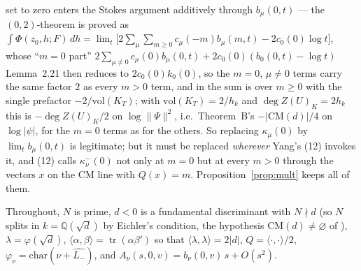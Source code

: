 \documentclass[11pt,reqno]{amsart}
\theoremstyle{plain}
\theoremstyle{definition}
\DeclareMathOperator{\tr}{tr}
\newcommand{\Q}{\mathbb{Q}}
\newcommand{\Lm}{L_{-}}
\begin{document}
set to zero enters the Stokes argument \cite[(33)]{Schofer} additively through $b_\mu(0,t)$ --- the
$(0,2)$-theorem is proved as $\int\Phi(z_0,h;F)\,dh=\lim_t\bigl[2\sum_\mu\sum_{m\ge0}c_\mu(-m)b_\mu(m,t)
-2c_0(0)\log t\bigr]$, whose ``$m=0$ part'' $2\sum_{\mu\neq0}c_\mu(0)b_\mu(0,t)+2c_0(0)(b_0(0,t)-\log t)$
Lemma~2.21 then reduces to $2c_0(0)k_0(0)$, so the $m=0$, $\mu\neq0$ terms carry the same factor $2$ as
every $m>0$ term, and in \cite[Thm.~3.4(ii), Cor.~3.5(i)]{Schofer} the sum is over $m\ge0$ with the
single prefactor $-2/\mathrm{vol}(K_T)$; with $\mathrm{vol}(K_T)=2/h_k$ and $\deg Z(U)_K=2h_k$ this is
$-\deg Z(U)_K/2$ on $\log\lVert\Psi\rVert^2$, i.e.\ Theorem~B's $-\lvert\mathrm{CM}(d)\rvert/4$ on
$\log\lvert\psi\rvert$, for the $m=0$ terms as for the others. So replacing $\kappa_\mu(0)$ by $\lim_tb_\mu(0,t)$ is legitimate; but it must be
replaced \emph{wherever} Yang's (12) invokes it, and (12) calls $\kappa^-_\nu(0)$ not only at
$m=0$ but at every $m>0$ through the vectors $x$ on the CM line with $Q(x)=m$.
Proposition~\ref{prop:mult} keeps all of them.

Throughout, $N$ is prime, $d<0$ is a fundamental discriminant with $N\nmid d$ (so $N$ splits in
$k=\Q(\sqrt d)$ by Eichler's condition, the hypothesis $\mathrm{CM}(d)\neq\varnothing$ of
\cite[Thm.~B]{GY}), $\lambda=\varphi(\sqrt d)$, $\langle\alpha,\beta\rangle=\tr(\alpha\beta')$ so
that $\langle\lambda,\lambda\rangle=2\lvert d\rvert$, $Q=\langle\cdot,\cdot\rangle/2$,
$\varphi_\nu=\mathrm{char}(\nu+\widehat{\Lm})$, and $A_\nu(s,0,v)=b_\nu(0,v)\,s+O(s^2)$.
\end{document}
